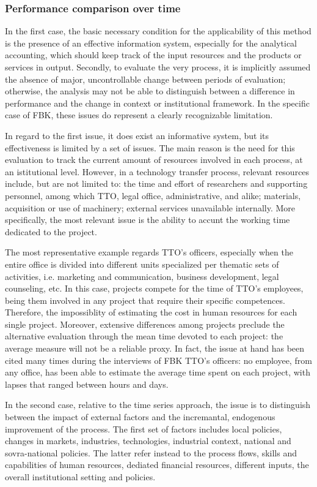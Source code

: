 \subsubsection{Performance comparison over time}

In the first case, the basic necessary condition for the applicability of this method is the presence of an effective information system, especially for the analytical accounting, which should keep track of the input resources and the products or services in output. Secondly, to evaluate the very process, it is implicitly assumed the absence of major, uncontrollable change between periods of evaluation; otherwise, the analysis may not be able to distinguish between a difference in performance and the change in context or institutional framework. In the specific case of FBK, these issues do represent a clearly recognizable limitation. 

In regard to the first issue, it does exist an informative system, but its effectiveness is limited by a set of issues. The main reason is the need for this evaluation to track the current amount of resources involved in each process, at an istitutional level. However, in a technology transfer process, relevant resources include, but are not limited to: the time and effort of researchers and supporting personnel, among which TTO, legal office, administrative, and alike; materials, acquisition or use of machinery; external services unavailable internally. More specifically, the most relevant issue is the ability to accunt the working time dedicated to the project. 

The most representative example regards TTO's officers, especially when the entire office is divided into different units specialized per thematic sets of activities, i.e. marketing and communication, business development, legal counseling, etc. In this case, projects compete for the time of TTO's employees, being them involved in any project that require their specific competences. Therefore, the impossiblity of estimating the cost in human resources for each single project. Moreover, extensive differences among projects preclude the alternative evaluation through the mean time devoted to each project: the average measure will not be a reliable proxy. In fact, the issue at hand has been cited many times during the interviews of FBK TTO's officers: no employee, from any office, has been able to estimate the average time spent on each project, with lapses that ranged between hours and days.

In the second case, relative to the time series approach, the issue is to distinguish between the impact of external factors and the incremantal, endogenous improvement of the process. The first set of factors includes local policies, changes in markets, industries, technologies, industrial context, national and sovra-national policies. The latter refer instead to the process flows, skills and capabilities of human resources, dediated financial resources, different inputs, the overall institutional setting and policies.

